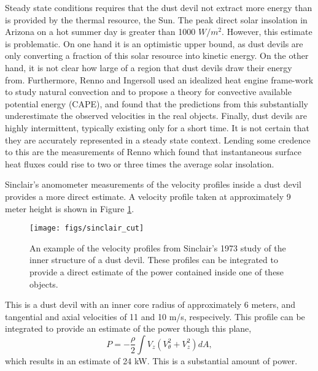 Steady state conditions requires that the dust devil not
extract more energy than is provided by the thermal resource, the Sun.   
The peak direct solar insolation in Arizona on a hot summer day is
greater than 1000 $W/m^2$. However, this estimate is problematic. 
On one hand it is an optimistic upper bound, as dust devils are only
converting a fraction of this solar resource into kinetic
energy. On the other hand, it is not clear how large of a region
that dust devils draw their energy from. 
Furthermore, Renno and Ingersoll\cite{renno_inger} used an
idealized heat engine frame-work to study natural convection and to
propose a theory for convective available potential energy (CAPE),
and found that the predictions from this substantially underestimate the
observed velocities in the real objects. Finally, dust devils are highly 
intermittent, typically existing only for a short time. It is
not certain that they are accurately represented in a steady
state context. Lending some credence to this are the measurements of
Renno\cite{} which found that instantaneous surface heat fluxes could
rise to two or three times the average solar insolation. 

Sinclair's anomometer measurements of the velocity profiles inside a dust 
devil provides a more direct estimate. A velocity profile taken 
at approximately 9 meter height is shown in Figure \ref{fig:sinclair_profile}. 

  \begin{figure}[!htb]
    \begin{center}
     \texttt{[image: figs/sinclair\_cut]}
     \caption{An example of the velocity profiles from Sinclair's 1973
     study of the inner structure of a dust devil. These profiles can be
     integrated to provide a direct estimate of the power contained
     inside one of these objects.}
     \label{fig:sinclair_profile}
    \end{center}
  \end{figure}

This is a dust devil with an inner core radius of approximately 
6 meters, and tangential and axial velocities of 11 and 10 m/s, respecively. 
This profile can be integrated to provide an estimate of the power though this plane, 
\begin{equation}
 P = -\frac{\rho }{2} \int V_z (V_{\theta}^2 + V_z^2 ) dA, 
\end{equation}
which results in an estimate of 24 kW. This is a substantial amount of
power. 

%
%

